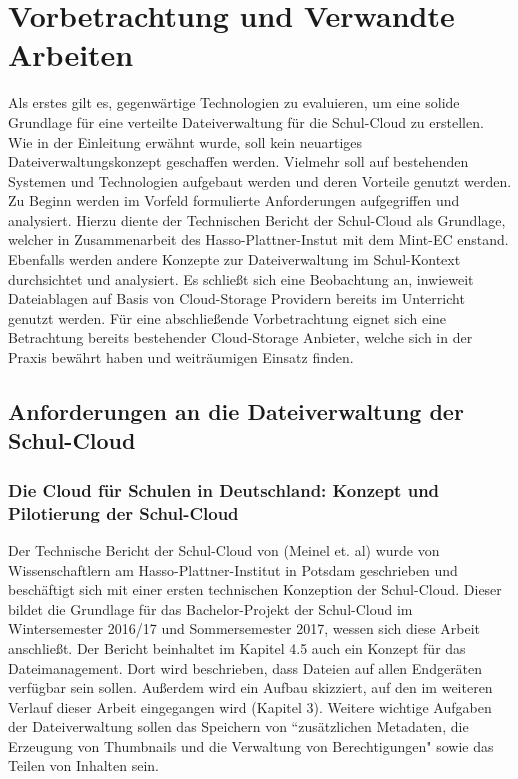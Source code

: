 \section{Vorbetrachtung und Verwandte Arbeiten}
\label{sec:relatedwork}

Als erstes gilt es, gegenwärtige Technologien zu evaluieren, um eine solide Grundlage für eine verteilte Dateiverwaltung für die Schul-Cloud zu erstellen. Wie in der Einleitung erwähnt wurde, soll kein neuartiges Dateiverwaltungskonzept geschaffen werden. Vielmehr soll auf bestehenden Systemen und Technologien aufgebaut werden und deren Vorteile genutzt werden. Zu Beginn werden im Vorfeld formulierte Anforderungen aufgegriffen und analysiert. Hierzu diente der Technischen Bericht der Schul-Cloud \cite{paper:technischerbericht} als Grundlage, welcher in Zusammenarbeit des Hasso-Plattner-Instut mit dem Mint-EC enstand. Ebenfalls werden andere Konzepte zur Dateiverwaltung im Schul-Kontext durchsichtet und analysiert. Es schließt sich eine Beobachtung an, inwieweit Dateiablagen auf Basis von Cloud-Storage Providern bereits im Unterricht genutzt werden. Für eine abschließende Vorbetrachtung eignet sich eine Betrachtung bereits bestehender Cloud-Storage Anbieter, welche sich in der Praxis bewährt haben und weiträumigen Einsatz finden.

\subsection{Anforderungen an die Dateiverwaltung der Schul-Cloud}

\subsubsection{Die Cloud für Schulen in Deutschland: Konzept und Pilotierung der Schul-Cloud}

Der Technische Bericht der Schul-Cloud \cite{paper:technischerbericht} von (Meinel et. al) wurde von Wissenschaftlern am Hasso-Plattner-Institut in Potsdam geschrieben und beschäftigt sich mit einer ersten technischen Konzeption der Schul-Cloud. Dieser bildet die Grundlage für das Bachelor-Projekt der Schul-Cloud im Wintersemester 2016/17 und Sommersemester 2017, wessen sich diese Arbeit anschließt. Der Bericht beinhaltet im Kapitel 4.5 auch ein Konzept für das Dateimanagement. Dort wird beschrieben, dass Dateien auf allen Endgeräten verfügbar sein sollen. Außerdem wird ein Aufbau skizziert, auf den im weiteren Verlauf dieser Arbeit eingegangen wird (Kapitel 3). Weitere wichtige Aufgaben der Dateiverwaltung sollen das Speichern von ``zusätzlichen Metadaten, die Erzeugung von Thumbnails und die Verwaltung von Berechtigungen" \cite{paper:technischerbericht} sowie das Teilen von Inhalten sein.

